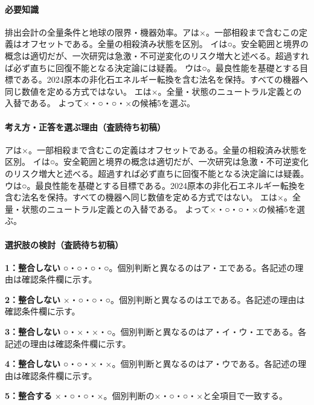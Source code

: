 \paragraph{必要知識} 排出会計の全量条件と地球の限界・機器効率。アは×。一部相殺まで含むこの定義はオフセットである。全量の相殺済み状態を区別。 イは○。安全範囲と境界の概念は適切だが、一次研究は急激・不可逆変化のリスク増大と述べる。超過すれば必ず直ちに回復不能となる決定論には疑義。 ウは○。最良性能を基礎とする目標である。2024原本の非化石エネルギー転換を含む法名を保持。すべての機器へ同じ数値を定める方式ではない。 エは×。全量・状態のニュートラル定義との入替である。 よって×・○・○・×の候補5を選ぶ。

\paragraph{考え方・正答を選ぶ理由（査読待ち初稿）} アは×。一部相殺まで含むこの定義はオフセットである。全量の相殺済み状態を区別。 イは○。安全範囲と境界の概念は適切だが、一次研究は急激・不可逆変化のリスク増大と述べる。超過すれば必ず直ちに回復不能となる決定論には疑義。 ウは○。最良性能を基礎とする目標である。2024原本の非化石エネルギー転換を含む法名を保持。すべての機器へ同じ数値を定める方式ではない。 エは×。全量・状態のニュートラル定義との入替である。 よって×・○・○・×の候補5を選ぶ。

\paragraph{選択肢の検討（査読待ち初稿）}\mbox{}\par

\noindent\textbf{1：整合しない} ○・○・○・○。個別判断と異なるのはア・エである。各記述の理由は確認条件欄に示す。\par

\noindent\textbf{2：整合しない} ×・○・○・○。個別判断と異なるのはエである。各記述の理由は確認条件欄に示す。\par

\noindent\textbf{3：整合しない} ○・×・×・○。個別判断と異なるのはア・イ・ウ・エである。各記述の理由は確認条件欄に示す。\par

\noindent\textbf{4：整合しない} ○・○・×・×。個別判断と異なるのはア・ウである。各記述の理由は確認条件欄に示す。\par

\noindent\textbf{5：整合する} ×・○・○・×。個別判断の×・○・○・×と全項目で一致する。\par

